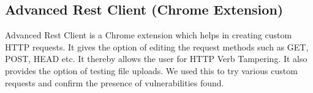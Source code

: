 \subsection{Advanced Rest Client (Chrome Extension)}
Advanced Rest Client is a Chrome extension which helps in creating custom HTTP requests. It gives the option of editing the request methods such as GET, POST, HEAD etc. It thereby allows the user for HTTP Verb Tampering. It also provides the option of testing file uploads. We used this to try various custom requests and confirm the presence of vulnerabilities found.\\